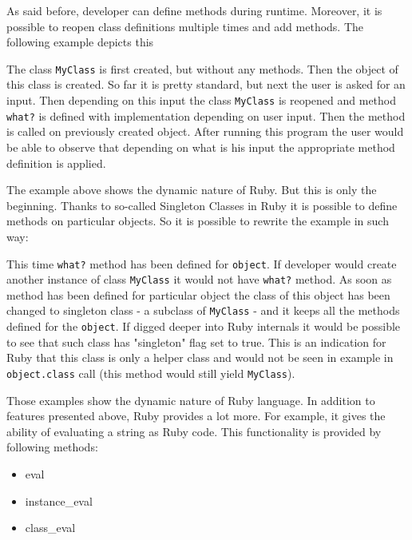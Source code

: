       As said before, developer can define methods during runtime. Moreover, it is possible to reopen 
      class definitions multiple times and add methods. The following example depicts this
    
      
    
      The class \texttt{MyClass} is first created, but without any methods. Then the object of this
      class is created. So far it is pretty standard, but next the user is asked for an input. Then
      depending on this input the class \texttt{MyClass} is reopened and method \texttt{what?} is
      defined with implementation depending on user input. Then the method is called on previously
      created object. After running this program the user would be able to observe that depending
      on what is his input the appropriate method definition is applied.
    
      The example above shows the dynamic nature of Ruby. But this is only the beginning. Thanks
      to so-called Singleton Classes in Ruby it is possible to define methods on particular objects.
      So it is possible to rewrite the example in such way:
    
      
    
      This time \texttt{what?} method has been defined for \texttt{object}. If developer would create
      another instance of class \texttt{MyClass} it would not have \texttt{what?} method. As soon as
      method has been defined for particular object the class of this object has been changed to 
      singleton class - a subclass of \texttt{MyClass} - and it keeps all the methods defined for the 
      \texttt{object}. If digged deeper into Ruby internals it would be 
      possible to see that such class has "singleton" flag set to true. This is an indication for Ruby
      that this class is only a helper class and would not be seen in example in \texttt{object.class}
      call (this method would still yield \texttt{MyClass}).
      
      Those examples show the dynamic nature of Ruby language. In addition to features presented above, 
      Ruby provides a lot more. For example, it gives the ability of evaluating a string as Ruby code.
      This functionality is provided by following methods:
        
        \begin{itemize}
          \item{eval}
          \item{instance\_eval}
          \item{class\_eval}
        \end{itemize}

